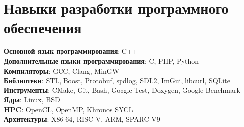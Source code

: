 \documentclass[a4paper,11pt]{article}
\makeatletter
\newcommand{\resumeSubheading}[4]{
    \vspace{-2pt}\item
    \begin{tabular*}{0.97\textwidth}[t]{l@{\extracolsep{\fill}}r}
        \textbf{#1} & #2 \\
        \textit{\small #3} & \textit{\small #4} \\
    \end{tabular*}\vspace{-10pt}
}
\newcommand{\resumeSubHeadingListStart}{\begin{itemize}[leftmargin=0.15in, label={}]}
\newcommand{\resumeSubHeadingListEnd}{\end{itemize}}
\makeatother
\begin{document}


\section{Навыки разработки программного обеспечения}
\begin{itemize}[leftmargin=0.15in, label={}]
    \normalsize{\item{
                    \textbf{Основной язык программирования}{: C++} \\
                    \textbf{Дополнительные языки программирования}{: C, PHP, Python} \\
                    \textbf{Компиляторы}{: GCC, Clang, MinGW} \\
                    \textbf{Библиотеки}{: STL, Boost, Protobuf, spdlog, SDL2, ImGui, libcurl, SQLite} \\
                    \textbf{Инструменты}{: CMake, Git, Bash, Google Test, Doxygen, Google Benchmark} \\
                    \textbf{Ядра}{: Linux, BSD} \\
                    \textbf{HPC}{: OpenCL, OpenMP, Khronos SYCL} \\
                    \textbf{Архитектуры}{: X86-64, RISC-V, ARM, SPARC V9} \\
              }}
\end{itemize}
\end{document}
